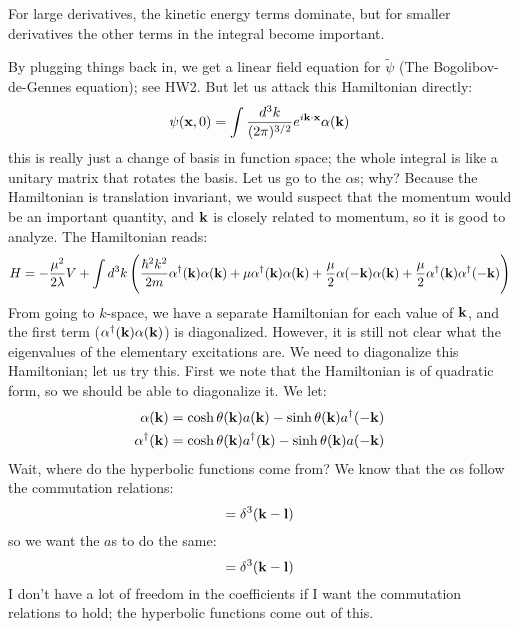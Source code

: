 For large derivatives, the kinetic energy terms dominate, but for smaller derivatives the other terms in the integral become important. 

By plugging things back in, we get a linear field equation for $\tilde{\psi}$ (The Bogolibov-de-Gennes equation); see HW2. But let us attack this Hamiltonian directly:
\begin{equation}
    \psi(\mathbf{x}, 0) = \int \frac{d^3k}{(2\pi)^{3/2}}e^{i\mathbf{k} \cdot \mathbf{x}}\alpha(\mathbf{k})
\end{equation}
this is really just a change of basis in function space; the whole integral is like a unitary matrix that rotates the basis. Let us go to the $\alpha$s; why? Because the Hamiltonian is translation invariant, we would suspect that the momentum would be an important quantity, and $\mathbf{k}$ is closely related to momentum, so it is good to analyze. The Hamiltonian reads:
\begin{equation}
    H = -\frac{\mu^2}{2\lambda}V + \int d^3k \left(\frac{\hbar^2k^2}{2m}\alpha^\dagger(\mathbf{k})\alpha(\mathbf{k}) + \mu \alpha^\dagger(\mathbf{k})\alpha(\mathbf{k}) + \frac{\mu}{2}\alpha(-\mathbf{k})\alpha(\mathbf{k}) + \frac{\mu}{2}\alpha^\dagger(\mathbf{k})\alpha^{\dagger}(-\mathbf{k})\right)
\end{equation}
From going to $k$-space, we have a separate Hamiltonian for each value of $\mathbf{k}$, and the first term ($\alpha^\dagger(\mathbf{k})\alpha(\mathbf{k})$) is diagonalized. However, it is still not clear what the eigenvalues of the elementary excitations are. We need to diagonalize this Hamiltonian; let us try this. First we note that the Hamiltonian is of quadratic form, so we should be able to diagonalize it. We let:
\begin{equation}\label{eq-bogoliubov}
    \begin{split}
        \alpha(\mathbf{k}) &= \cosh\theta(\mathbf{k})a(\mathbf{k}) - \sinh\theta(\mathbf{k})a^{\dagger}(-\mathbf{k})
        \\ \alpha^\dagger(\mathbf{k}) &= \cosh\theta(\mathbf{k})a^\dagger(\mathbf{k}) - \sinh\theta(\mathbf{k})a(-\mathbf{k})
    \end{split}
\end{equation}
Wait, where do the hyperbolic functions come from? We know that the $\alpha$s follow the commutation relations:
\begin{equation}
    [\alpha(\v{k}), \alpha^\dag(\v{l})] = \delta^3(\v{k} - \v{l})
\end{equation}
so we want the $a$s to do the same:
\begin{equation}
    [a(\v{k}), a^\dag(\v{l})] = \delta^3(\v{k} - \v{l})
\end{equation}
I don't have a lot of freedom in the coefficients if I want the commutation relations to hold; the hyperbolic functions come out of this.

